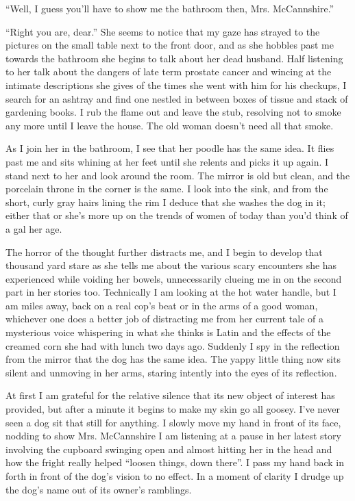 ``Well, I guess you'll have to show me the bathroom then,
Mrs. McCannshire.''

``Right you are, dear.'' She seems to notice that my gaze has strayed to
the pictures on the small table next to the front door, and as she
hobbles past me towards the bathroom she begins to talk about her dead
husband. Half listening to her talk about the dangers of late term
prostate cancer and wincing at the intimate descriptions she gives of
the times she went with him for his checkups, I search for an ashtray
and find one nestled in between boxes of tissue and stack of gardening
books. I rub the flame out and leave the stub, resolving not to smoke
any more until I leave the house. The old woman doesn't need all that
smoke.

As I join her in the bathroom, I see that her poodle has the same
idea. It flies past me and sits whining at her feet until she relents
and picks it up again. I stand next to her and look around the room. The
mirror is old but clean, and the porcelain throne in the corner is the
same. I look into the sink, and from the short, curly gray hairs lining
the rim I deduce that she washes the dog in it; either that or she's
more up on the trends of women of today than you'd think of a gal her
age.

The horror of the thought further distracts me, and I begin to develop
that thousand yard stare as she tells me about the various scary
encounters she has experienced while voiding her bowels, unnecessarily
clueing me in on the second part in her stories too. Technically I am
looking at the hot water handle, but I am miles away, back on a real
cop's beat or in the arms of a good woman, whichever one does a better
job of distracting me from her current tale of a mysterious voice
whispering in what she thinks is Latin and the effects of the creamed
corn she had with lunch two days ago. Suddenly I spy in the reflection
from the mirror that the dog has the same idea. The yappy little thing
now sits silent and unmoving in her arms, staring intently into the eyes
of its reflection.

At first I am grateful for the relative silence that its new object of
interest has provided, but after a minute it begins to make my skin go
all goosey. I've never seen a dog sit that still for anything. I slowly
move my hand in front of its face, nodding to show Mrs. McCannshire I am
listening at a pause in her latest story involving the cupboard swinging
open and almost hitting her in the head and how the fright really helped
``loosen things, down there''. I pass my hand back in forth in front of
the dog's vision to no effect. In a moment of clarity I drudge up the
dog's name out of its owner's ramblings.

